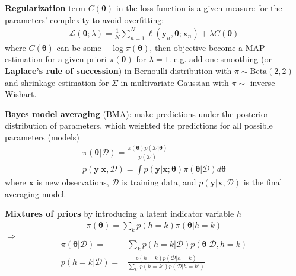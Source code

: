\textbf{Regularization} term $C(\bm{\theta})$ in the loss function is 
a given measure for the parameters' complexity to avoid overfitting:
\begin{gather}
    \mathcal{L}(\bm{\theta};\lambda)
    = \frac{1}{N}\sum_{n=1}^N\ell(\bm{y}_n,\bm{\theta};\bm{x}_n)
    + \lambda C(\bm{\theta})
\end{gather}
where $C(\bm{\theta})$ can be some $-\log{\pi(\bm{\theta})}$,
then objective become a MAP estimation for a given priori $\pi(\bm{\theta})$ for $\lambda=1$.
e.g. add-one smoothing (or \textbf{Laplace's rule of succession}) in Bernoulli distribution with $\pi\sim\text{Beta}(2,2)$ and shrinkage estimation for $\Sigma$ in multivariate Gaussian with $\pi\sim$ inverse Wishart. 

\textbf{Bayes model averaging} (BMA): make predictions under the posterior distribution of parameters, which weighted the predictions for all possible parameters (models)
\begin{gather}
    \pi(\bm{\theta}|\mathcal{D})
    = \frac{\pi(\bm{\theta})p(\mathcal{D}|\bm{\theta})}{p(\mathcal{D})}\\
    p(\bm{y}|\bm{x},\mathcal{D})
    = \int{p(\bm{y}|\bm{x};\bm{\theta})\pi(\bm{\theta}|\mathcal{D})}d\bm{\theta}
\end{gather}
where $\bm{x}$ is new observations, $\mathcal{D}$ is training data, and 
$p(\bm{y}|\bm{x},\mathcal{D})$ is the final averaging model.


\textbf{Mixtures of priors} by introducing a latent indicator variable $h$
\begin{gather}
    \pi(\bm{\theta})=\sum_k p(h=k)\pi(\bm{\theta}|h=k)
\end{gather}
$\Rightarrow$
\begin{align}
    \pi(\bm{\theta}|\mathcal{D})
    =& \sum_k{p(h=k|\mathcal{D})p(\bm{\theta}|\mathcal{D},h=k)}\\
    p(h=k|\mathcal{D})
    =& \frac{p(h=k)p(\mathcal{D}|h=k)}{\sum_{k'}{p(h=k')p(\mathcal{D}|h=k')}}
\end{align}

